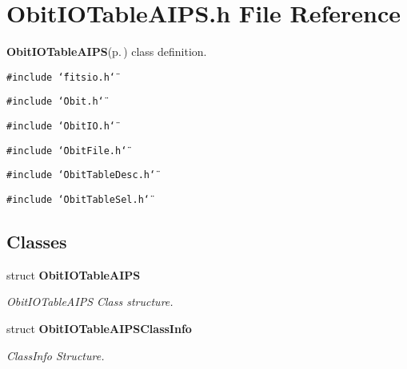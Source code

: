 \section{Obit\-IOTable\-AIPS.h File Reference}
\label{ObitIOTableAIPS_8h}
{\bf Obit\-IOTable\-AIPS}{\rm (p.\,\pageref{structObitIOTableAIPS})} class definition. 

{\tt \#include \char`\"{}fitsio.h\char`\"{}}\par
{\tt \#include \char`\"{}Obit.h\char`\"{}}\par
{\tt \#include \char`\"{}Obit\-IO.h\char`\"{}}\par
{\tt \#include \char`\"{}Obit\-File.h\char`\"{}}\par
{\tt \#include \char`\"{}Obit\-Table\-Desc.h\char`\"{}}\par
{\tt \#include \char`\"{}Obit\-Table\-Sel.h\char`\"{}}\par
\subsection*{Classes}
\begin{CompactItemize}
\item 
struct {\bf Obit\-IOTable\-AIPS}
\begin{CompactList}\small\item\em Obit\-IOTable\-AIPS Class structure. \item\end{CompactList}\item 
struct {\bf Obit\-IOTable\-AIPSClass\-Info}
\begin{CompactList}\small\item\em Class\-Info Structure. \item\end{CompactList}\end{CompactItemize}
